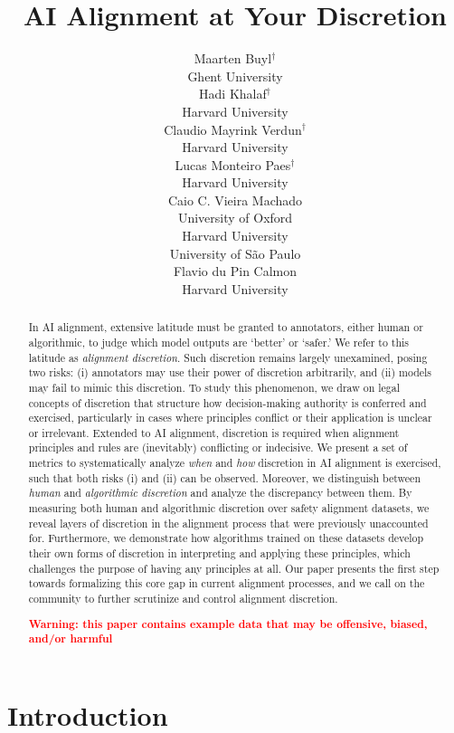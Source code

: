 \documentclass{article}
\title{AI Alignment at Your Discretion}
\author{
Maarten Buyl$^\dagger$\\
Ghent University\\
\And
Hadi Khalaf$^\dagger$\\
Harvard University\\
\And
Claudio Mayrink Verdun$^\dagger$\\
Harvard University\\
\And
Lucas Monteiro Paes$^\dagger$\\
Harvard University\\
\And
Caio C. Vieira Machado\\
University of Oxford\\
Harvard University\\
University of S\~ao Paulo\\
\And
Flavio du Pin Calmon\\
Harvard University\\
}
\date{}
\begin{document}
\maketitle
\begin{abstract}
In AI alignment, extensive latitude must be granted to annotators, either human or algorithmic, to judge which model outputs are `better' or `safer.' 
We refer to this latitude as \textit{alignment discretion}. Such discretion remains largely unexamined, posing two risks: (i) annotators may use their power of discretion arbitrarily, and (ii) models may fail to mimic this discretion. To study this phenomenon, we draw on legal concepts of discretion that structure how decision-making authority is conferred and exercised, particularly in cases where principles conflict or their application is unclear or irrelevant.
Extended to AI alignment, discretion is required when alignment principles and rules are (inevitably) conflicting or indecisive.
We present a set of metrics to systematically analyze \textit{when} and \textit{how} discretion in AI alignment is exercised, such that both risks (i) and (ii) can be observed.
Moreover, we distinguish between \textit{human} and \textit{algorithmic discretion} and analyze the discrepancy between them. By measuring both human and algorithmic discretion over safety alignment datasets, we reveal layers of discretion in the alignment process that were previously unaccounted for. Furthermore, we demonstrate how algorithms trained on these datasets develop their own forms of discretion in interpreting and applying these principles, which challenges the purpose of having any principles at all.
Our paper presents the first step towards formalizing this core gap in current alignment processes, and we call on the community to further scrutinize and control alignment discretion.

\textcolor{red}{\textbf{Warning: this paper contains example data that may be offensive, biased, and/or harmful}}
\end{abstract}

\section{Introduction}
\def\thefootnote{$\dagger$}
\def\thefootnote{}
\def\thefootnote{\arabic{footnote}}
\end{document}
